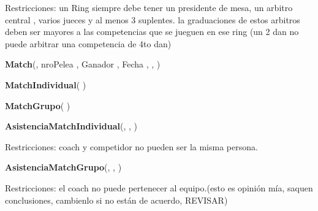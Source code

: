 Restricciones: un Ring siempre debe tener un presidente de mesa, un arbitro central , varios jueces y al menos 3 suplentes. la graduaciones de estos arbitros deben ser mayores a las competencias que se jueguen en ese ring (un 2 dan no puede arbitrar una competencia de 4to dan)

\textbf{Match}(, nroPelea , Ganador , Fecha ,  , )

\textbf{MatchIndividual}( )

\textbf{MatchGrupo}( )

\textbf{AsistenciaMatchIndividual}(, ,  )

Restricciones: coach y competidor no pueden ser la misma persona.

\textbf{AsistenciaMatchGrupo}(, ,  )

Restricciones: el coach no puede pertenecer al equipo.(esto es opinión mía, saquen conclusiones, cambienlo si no están de acuerdo, REVISAR)